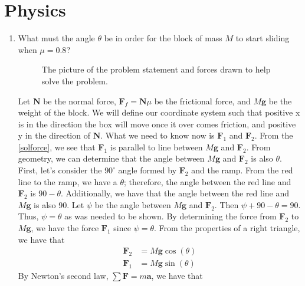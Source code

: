 \section{Physics}

\begin{enumerate}
\item
  What must the angle \(\theta\) be in order for the block of mass \(M\) to
  start sliding when \(\mu = 0.8\)?
  \begin{figure}[H]
    \centering
    \qquad
    \caption{The picture of the problem statement and forces drawn to help solve
      the problem.}
  \end{figure}
  Let \(\mathbf{N}\) be the normal force, \(\mathbf{F}_f = \mathbf{N}\mu\) be the
  frictional force, and \(M\mathbf{g}\) be the weight of the block.
  We will define our coordinate system such that positive x is in the direction
  the box will move once it over comes friction, and positive y in the direction
  of \(\mathbf{N}\).
  What we need to know now is \(\mathbf{F}_1\) and \(\mathbf{F}_2\).
  From the \cref{solforce}, we see that \(\mathbf{F}_1\) is parallel to line
  between \(M\mathbf{g}\) and \(\mathbf{F}_2\).
  From geometry, we can determine that the angle between \(M\mathbf{g}\) and
  \(\mathbf{F}_2\) is also \(\theta\).
  First, let's consider the \(90^{\circ}\) angle formed by \(\mathbf{F}_2\)
  and the ramp.
  From the red line to the ramp, we have a \(\theta\); therefore, the angle
  between the red line and \(\mathbf{F}_2\) is \(90 - \theta\).
  Additionally, we have that the angle between the red line and \(M\mathbf{g}\)
  is also \(90\).
  Let \(\psi\) be the angle between \(M\mathbf{g}\) and \(\mathbf{F}_2\).
  Then \(\psi + 90 - \theta = 90\).
  Thus, \(\psi = \theta\) as was needed to be shown.
  By determining the force from \(\mathbf{F}_2\) to \(M\mathbf{g}\), we have
  the force \(\mathbf{F}_1\) since \(\psi = \theta\).
  From the properties of a right triangle, we have that
  \begin{align*}
    \mathbf{F}_2 &= M\mathbf{g}\cos(\theta)\\
    \mathbf{F}_1 &= M\mathbf{g}\sin(\theta)
  \end{align*}
  By Newton's second law, \(\sum\mathbf{F} = m\mathbf{a}\), we have that

\end{enumerate}
